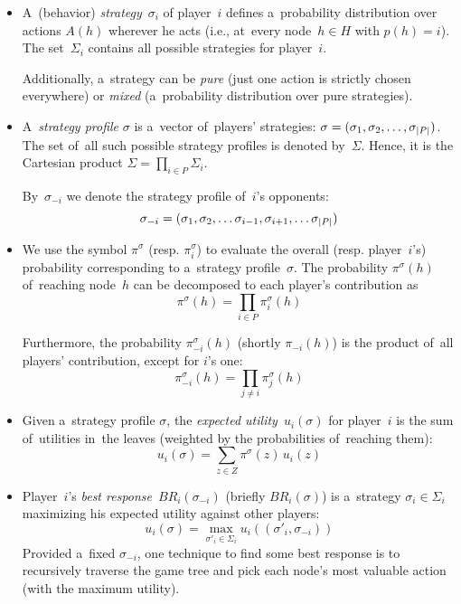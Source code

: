 \begin{itemize}
  \item A~(behavior) \emph{strategy}~$\sigma_i$ of player~$i$ defines a~probability distribution over actions $A(h)$ wherever he acts (i.e., at~every node~$h \in H$ with $p(h) = i$).
    The set~$\Sigma_i$ contains all possible strategies for player~$i$.

  Additionally, a~strategy can be \emph{pure} (just one action is strictly chosen everywhere) or \emph{mixed} (a~probability distribution over pure strategies).

  \item A~\emph{strategy profile} $\sigma$ is a~vector of~players' strategies:
    $\sigma = (\sigma_1, \sigma_2, \ldots, \sigma_ {\left|{P}\right|})$.
    The set of~all such possible strategy profiles is denoted by~$\Sigma$.
    Hence, it is the Cartesian product $\Sigma = \prod_{i \in P} \Sigma_i$.

    By~$\sigma_{-i}$ we denote the strategy profile of~$i$'s opponents:
    \[ \sigma_{-i} = (\sigma_1, \sigma_2, \ldots \sigma_{i-1}, \sigma_{i+1}, \ldots \sigma_ {\left|{P}\right|}) \]

  \item We use the symbol $\pi^\sigma$ (resp. $\pi_i^\sigma$) to evaluate the overall (resp. player~$i$'s) probability corresponding to a~strategy profile~$\sigma$.
    The probability $\pi^\sigma(h)$ of~reaching node~$h$ can be decomposed to each player's contribution as
    \[ \pi ^\sigma(h) = \prod _{i \in P} \pi _i ^\sigma (h) \]

    Furthermore, the probability $\pi _{-i} ^\sigma (h)$ (shortly $\pi _{-i} (h)$) is the product of~all players' contribution, except for $i$'s one:
    \[ \pi _{-i} ^\sigma(h) = \prod _{j \ne i} \pi _j ^\sigma (h) \]
    
  \item Given a~strategy profile $\sigma$, the \emph{expected utility}~$u_i (\sigma)$ for player~$i$
    is the sum of~utilities in~the leaves (weighted by the probabilities of~reaching them):
    \[ u_i (\sigma) = \sum _{z \in Z} \pi^\sigma\!(z) \,u_i(z)\]

  \item Player~$i$'s \emph{best response}~$BR _i (\sigma _{-i})$ (briefly $BR _i (\sigma)$) is a~strategy $\sigma _i \in \Sigma _i$ maximizing his expected utility against other players:
    \[ u_i (\sigma) = \max _{\sigma'_i \in \Sigma_i} u_i ((\sigma'_i, \sigma_{-i})) \]
    Provided a~fixed $\sigma_{-i}$, one technique to find some best response is to recursively traverse the game tree and pick each node's most valuable action (with the maximum utility).


\end{itemize}
